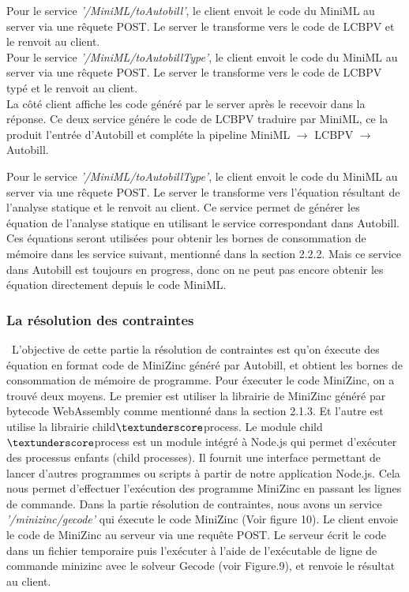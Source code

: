 \documentclass[12pt]{article}
\begin{document}
Pour le service \emph{'/MiniML/toAutobill'}, le client envoit le code du MiniML au server via une rêquete POST. Le server le transforme vers le code de LCBPV et le renvoit au client.\\
Pour le service \emph{'/MiniML/toAutobillType'}, le client envoit le code du MiniML au server via une rêquete POST. Le server le transforme vers le code de LCBPV typé et le renvoit au client.\\
La côté client affiche les code généré par le server après le recevoir dans la réponse. Ce deux service génére le code de LCBPV traduire par MiniML, ce la produit l'entrée d'Autobill et compléte la pipeline MiniML $\rightarrow$ LCBPV $\rightarrow$ Autobill.

Pour le service \emph{'/MiniML/toAutobillType'}, le client envoit le code du MiniML au server via une rêquete POST. Le server le transforme vers l'équation résultant de l'analyse statique et le renvoit au client. Ce service permet de générer les équation de l'analyse statique en utilisant le service correspondant dans Autobill. Ces équations seront utilisées pour obtenir les bornes de consommation de mémoire dans les service suivant, mentionné dans la section 2.2.2. Mais ce service dans Autobill est toujours en progress, donc on ne peut pas encore obtenir les équation directement depuis le code MiniML.


\subsubsection{La résolution des contraintes}\
L'objective de cette partie la résolution de contraintes est qu'on éxecute des équation en format code de MiniZinc généré par Autobill, et obtient les bornes de consommation de mémoire de programme. Pour éxecuter le code MiniZinc, on a trouvé deux moyens. Le premier est utiliser la librairie de MiniZinc généré par bytecode WebAssembly comme mentionné dans la section 2.1.3. Et l'autre est utilise la librairie child$\textunderscore$process. Le module child$\textunderscore$process est un module intégré à Node.js qui permet d'exécuter des processus enfants (child processes). Il fournit une interface permettant de lancer d'autres programmes ou scripts à partir de notre application Node.js. Cela nous permet d'effectuer l'exécution des programme MiniZinc en passant les lignes de commande.
Dans la partie résolution de contraintes, nous avons un service \emph{'/minizinc/gecode'} qui éxecute le code MiniZinc (Voir figure 10). Le client envoie le code de MiniZinc au serveur via une requête POST. Le serveur écrit le code dans un fichier temporaire puis l'exécuter à l'aide de l'exécutable de ligne de commande minizinc avec le solveur Gecode (voir Figure.9), et renvoie le résultat au client.
\end{document}
